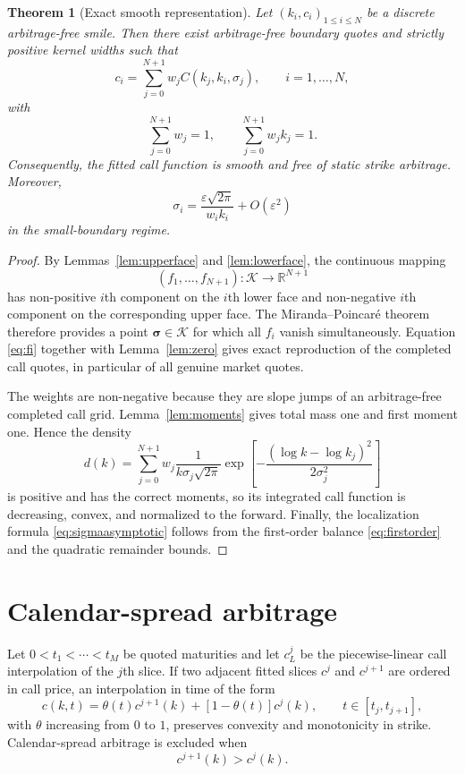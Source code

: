 \documentclass[11pt]{article}
\newtheorem{theorem}{Theorem}[section]
\newcommand{\R}{\mathbb{R}}
\newcommand{\eps}{\varepsilon}
\begin{document}
\begin{theorem}[Exact smooth representation]\label{thm:exact}
Let $(k_i,c_i)_{1\le i\le N}$ be a discrete arbitrage-free smile. Then there exist arbitrage-free boundary quotes and strictly positive kernel widths such that
\begin{equation}
c_i=\sum_{j=0}^{N+1}w_jC(k_j,k_i,\sigma_j),
\qquad i=1,\ldots,N,
\label{eq:exactfit}
\end{equation}
with
\[
\sum_{j=0}^{N+1}w_j=1,
\qquad
\sum_{j=0}^{N+1}w_jk_j=1.
\]
Consequently, the fitted call function is smooth and free of static strike arbitrage. Moreover,
\begin{equation}
\sigma_i
=\frac{\eps\sqrt{2\pi}}{w_i k_i}+O(\eps^2)
\label{eq:sigmaasymptotic}
\end{equation}
in the small-boundary regime.
\end{theorem}

\begin{proof}
By Lemmas~\ref{lem:upperface} and \ref{lem:lowerface}, the continuous mapping
\[
(f_1,\ldots,f_{N+1}):\mathcal K\to\R^{N+1}
\]
has non-positive $i$th component on the $i$th lower face and non-negative $i$th component on the corresponding upper face. The Miranda--Poincar\'e theorem therefore provides a point $\bm\sigma\in\mathcal K$ for which all $f_i$ vanish simultaneously. Equation \eqref{eq:fi} together with Lemma~\ref{lem:zero} gives exact reproduction of the completed call quotes, in particular of all genuine market quotes.

The weights are non-negative because they are slope jumps of an arbitrage-free completed call grid. Lemma~\ref{lem:moments} gives total mass one and first moment one. Hence the density
\[
d(k)=\sum_{j=0}^{N+1}w_j
\frac{1}{k\sigma_j\sqrt{2\pi}}
\exp\!\left[-\frac{(\log k-\log k_j)^2}{2\sigma_j^2}\right]
\]
is positive and has the correct moments, so its integrated call function is decreasing, convex, and normalized to the forward. Finally, the localization formula \eqref{eq:sigmaasymptotic} follows from the first-order balance \eqref{eq:firstorder} and the quadratic remainder bounds.
\end{proof}

\section{Calendar-spread arbitrage}\label{sec:calendar}
Let $0<t_1<\cdots<t_M$ be quoted maturities and let $c_L^j$ be the piecewise-linear call interpolation of the $j$th slice. If two adjacent fitted slices $c^j$ and $c^{j+1}$ are ordered in call price, an interpolation in time of the form
\begin{equation}
c(k,t)=\theta(t)c^{j+1}(k)+[1-\theta(t)]c^j(k),
\qquad t\in[t_j,t_{j+1}],
\label{eq:timeinterp}
\end{equation}
with $\theta$ increasing from $0$ to $1$, preserves convexity and monotonicity in strike. Calendar-spread arbitrage is excluded when
\begin{equation}
c^{j+1}(k)>c^j(k).
\label{eq:calendarcondition}
\end{equation}
\end{document}

